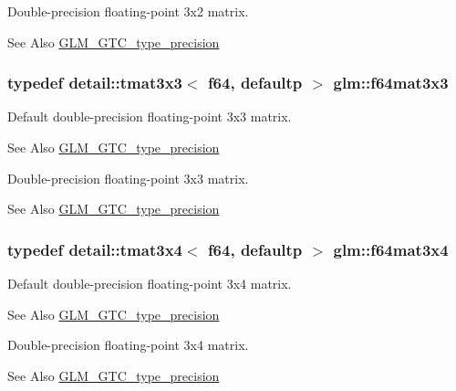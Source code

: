 Double-\/precision floating-\/point 3x2 matrix. \begin{DoxySeeAlso}{See Also}
\hyperlink{group__gtc__type__precision}{G\-L\-M\-\_\-\-G\-T\-C\-\_\-type\-\_\-precision} 
\end{DoxySeeAlso}
\hypertarget{group__gtc__type__precision_gad74db0197015b8d1d77ce54cf8d0ae60}{
\subsubsection[{f64mat3x3}]{\setlength{\rightskip}{0pt plus 5cm}typedef detail\-::tmat3x3$<$ f64, defaultp $>$ {\bf glm\-::f64mat3x3}}}\label{group__gtc__type__precision_gad74db0197015b8d1d77ce54cf8d0ae60}
Default double-\/precision floating-\/point 3x3 matrix. \begin{DoxySeeAlso}{See Also}
\hyperlink{group__gtc__type__precision}{G\-L\-M\-\_\-\-G\-T\-C\-\_\-type\-\_\-precision}
\end{DoxySeeAlso}
Double-\/precision floating-\/point 3x3 matrix. \begin{DoxySeeAlso}{See Also}
\hyperlink{group__gtc__type__precision}{G\-L\-M\-\_\-\-G\-T\-C\-\_\-type\-\_\-precision} 
\end{DoxySeeAlso}
\hypertarget{group__gtc__type__precision_gac9468e5fa519d06b452d3126bb22a597}{
\subsubsection[{f64mat3x4}]{\setlength{\rightskip}{0pt plus 5cm}typedef detail\-::tmat3x4$<$ f64, defaultp $>$ {\bf glm\-::f64mat3x4}}}\label{group__gtc__type__precision_gac9468e5fa519d06b452d3126bb22a597}
Default double-\/precision floating-\/point 3x4 matrix. \begin{DoxySeeAlso}{See Also}
\hyperlink{group__gtc__type__precision}{G\-L\-M\-\_\-\-G\-T\-C\-\_\-type\-\_\-precision}
\end{DoxySeeAlso}
Double-\/precision floating-\/point 3x4 matrix. \begin{DoxySeeAlso}{See Also}
\hyperlink{group__gtc__type__precision}{G\-L\-M\-\_\-\-G\-T\-C\-\_\-type\-\_\-precision} 
\end{DoxySeeAlso}
